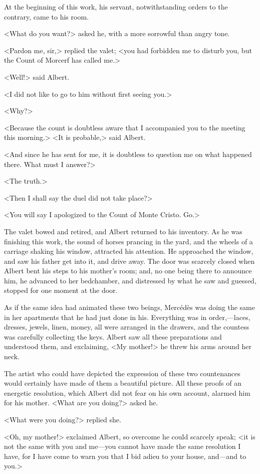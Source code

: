  At the beginning of this work, his servant, notwithstanding orders to the contrary, came to his room. 

 <What do you want?> asked he, with a more sorrowful than angry tone. 

 <Pardon me, sir,> replied the valet; <you had forbidden me to disturb you, but the Count of Morcerf has called me.> 

 <Well!> said Albert. 

 <I did not like to go to him without first seeing you.> 

 <Why?> 

 <Because the count is doubtless aware that I accompanied you to the meeting this morning.>  <It is probable,> said Albert. 

 <And since he has sent for me, it is doubtless to question me on what happened there. What must I answer?> 

 <The truth.> 

 <Then I shall say the duel did not take place?> 

 <You will say I apologized to the Count of Monte Cristo. Go.> 

 The valet bowed and retired, and Albert returned to his inventory. As he was finishing this work, the sound of horses prancing in the yard, and the wheels of a carriage shaking his window, attracted his attention. He approached the window, and saw his father get into it, and drive away. The door was scarcely closed when Albert bent his steps to his mother's room; and, no one being there to announce him, he advanced to her bedchamber, and distressed by what he saw and guessed, stopped for one moment at the door. 

 As if the same idea had animated these two beings, Mercédès was doing the same in her apartments that he had just done in his. Everything was in order,—laces, dresses, jewels, linen, money, all were arranged in the drawers, and the countess was carefully collecting the keys. Albert saw all these preparations and understood them, and exclaiming, <My mother!> he threw his arms around her neck. 

 The artist who could have depicted the expression of these two countenances would certainly have made of them a beautiful picture. All these proofs of an energetic resolution, which Albert did not fear on his own account, alarmed him for his mother. <What are you doing?> asked he. 

 <What were you doing?> replied she. 

 <Oh, my mother!> exclaimed Albert, so overcome he could scarcely speak; <it is not the same with you and me—you cannot have made the same resolution I have, for I have come to warn you that I bid adieu to your house, and—and to you.> 

